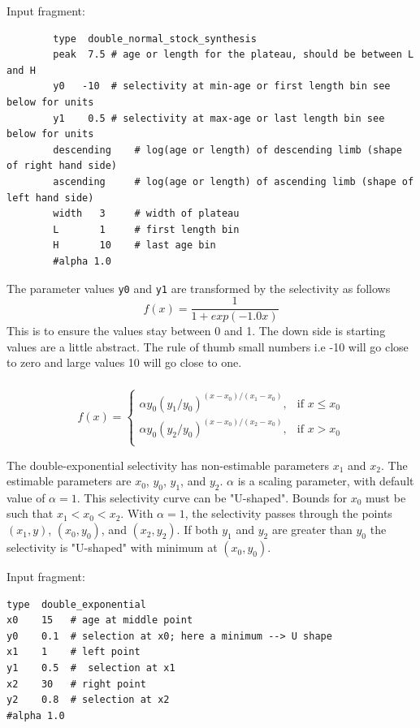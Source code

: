 Input fragment: {\small{\begin{verbatim}
		type  double_normal_stock_synthesis
		peak  7.5 # age or length for the plateau, should be between L and H
		y0	 -10  # selectivity at min-age or first length bin see below for units
		y1	  0.5 # selectivity at max-age or last length bin see below for units
		descending 	  # log(age or length) of descending limb (shape of right hand side) 
		ascending 	  # log(age or length) of ascending limb (shape of left hand side) 
		width   3     # width of plateau
		L  		1     # first length bin
		H 		10    # last age bin
		#alpha 1.0
		\end{verbatim}}}


The parameter values \texttt{y0} and \texttt{y1} are transformed by the selectivity as follows
\[
f(x) = \frac{1}{1+exp(-1.0 x )}
\] 
This is to ensure the values stay between 0 and 1. The down side is starting values are a little abstract. The rule of thumb small numbers i.e -10 will go close to zero and large values 10 will go close to one.



\subsubsection[Double-exponential]{}\label{sec:Selectivity-DoubleExponential}

\begin{equation}
f(x)=\begin{cases}
	  \alpha y_0(y_1 / y_0)^{(x-x_0)/(x_1-x_0)}, & \text{if $x \le x_0$} \\
	  \alpha y_0(y_2 / y_0)^{(x-x_0)/(x_2-x_0)}, & \text{if $x > x_0$} \\
  \end{cases}
\end{equation}

The double-exponential selectivity has non-estimable parameters $x_1$ and $x_2$. The estimable parameters are $x_0$, $y_0$, $y_1$, and $y_2$.  $\alpha$ is a scaling parameter, with default value of $\alpha = 1$. This selectivity curve can be "U-shaped". Bounds for $x_0$ must be such that $x_1 < x_0 < x_2$. With $\alpha=1$, the selectivity passes through the points $(x_1, y)$, $(x_0, y_0)$, and $(x_2, y_2)$. If both $y_1$ and $y_2$ are greater than $y_0$ the selectivity is "U-shaped" with minimum at $(x_0, y_0)$.

Input fragment: {\small{\begin{verbatim}
type  double_exponential
x0    15   # age at middle point
y0    0.1  # selection at x0; here a minimum --> U shape
x1    1    # left point
y1    0.5  #  selection at x1
x2    30   # right point
y2    0.8  # selection at x2
#alpha 1.0
\end{verbatim}}}


